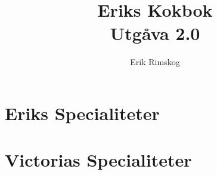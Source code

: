\documentclass[12pt,a4paper]{article}
\title{\Huge Eriks Kokbok\\\medskip
  \large Utgåva 2.0\\\smallskip
  \small\texttt\shortHEAD}
\author{Erik Rimskog}
\newcommand{\includerecipe}[1]{}
\begin{document}
\maketitle
\thispagestyle{empty}
\newpage
\tableofcontents
\newpage
\part{Eriks Specialiteter}
\includerecipe{korvstroganoff}
\includerecipe{pannkakor}

\part{Victorias Specialiteter}
\includerecipe{linscurry}
\end{document}
